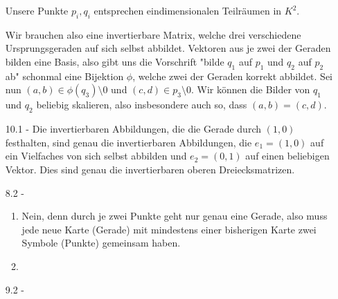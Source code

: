 \documentclass{article}
\begin{document}
\begin{enumerate}
		Unsere Punkte $p_i, q_i$ entsprechen eindimensionalen Teilräumen in $K^2$.
		
		Wir brauchen also eine invertierbare Matrix, welche drei verschiedene Ursprungsgeraden auf sich selbst abbildet. Vektoren aus je zwei der Geraden bilden eine Basis, also gibt uns die Vorschrift "bilde $q_1$ auf $p_1$ und $q_2$ auf $p_2$ ab" schonmal eine Bijektion $\phi$, welche zwei der Geraden korrekt abbildet. Sei nun $(a,b) \in \phi(q_3) \setminus 0$ und $(c,d) \in p_3 \setminus 0$. Wir können die Bilder von $q_1$ und $q_2$ beliebig skalieren, also insbesondere auch so, dass $(a,b) = (c,d)$.
		\item[10.1 - \tbf{3}]
		Die invertierbaren Abbildungen, die die Gerade durch $(1,0)$ festhalten, sind genau die invertierbaren Abbildungen, die $e_1 = (1,0)$ auf ein Vielfaches von sich selbst abbilden und $e_2 = (0,1)$ auf einen beliebigen Vektor. Dies sind genau die invertierbaren oberen Dreiecksmatrizen.
		\item[8.2 - \tbf{2}]
		
		\begin{enumerate}		\item Nein, denn durch je zwei Punkte geht nur genau eine Gerade, also muss jede neue Karte (Gerade) mit mindestens einer bisherigen Karte zwei Symbole (Punkte) gemeinsam haben.
			\item 
		\end{enumerate}
	
		\item[9.2 - \tbf{2}] 
	\end{enumerate}
\end{document}
